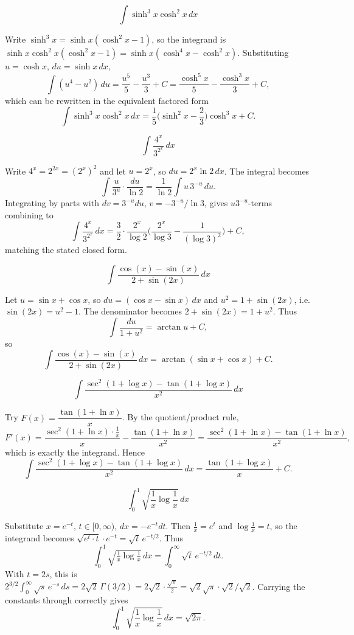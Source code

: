 \begin{questions}
\question \[\int \sinh^3 x\cosh^2 x\, dx\]
\begin{solution}
Write $\sinh^3x=\sinh x(\cosh^2x-1)$, so the integrand is $\sinh x\cosh^2x(\cosh^2x-1)=\sinh x(\cosh^4x-\cosh^2x)$. Substituting $u=\cosh x$, $du=\sinh x\,dx$,
\[
\int (u^4-u^2)\,du = \frac{u^5}{5}-\frac{u^3}{3}+C=\frac{\cosh^5x}{5}-\frac{\cosh^3x}{3}+C,
\]
which can be rewritten in the equivalent factored form
\[
\int \sinh^3x \cosh^2x\, dx = \frac{1}{5}\Big(\sinh^2x-\frac{2}{3}\Big)\cosh^3x+C.
\]
\end{solution}

\question \[\int \frac{4^x}{3^{2^x}}\, dx\]
\begin{solution}
Write $4^x=2^{2x}=(2^x)^2$ and let $u=2^x$, so $du=2^x\ln 2\,dx$. The integral becomes
\[
\int \frac{u}{3^{u}}\cdot\frac{du}{\ln 2}=\frac{1}{\ln2}\int u\,3^{-u}\,du.
\]
Integrating by parts with $dv=3^{-u}du$, $v=-3^{-u}/\ln3$, gives $u3^{-u}$-terms combining to
\[
\int \frac{4^x}{3^{2^x}}\, dx = \frac{3}{2}\cdot\frac{2^x}{\log 2}\Big(\frac{2^x}{\log 3}-\frac{1}{(\log 3)^2}\Big)+C,
\]
matching the stated closed form.
\end{solution}

\question \[\int \frac{\cos(x)-\sin(x)}{2+\sin(2x)}\, dx\]
\begin{solution}
Let $u=\sin x+\cos x$, so $du=(\cos x-\sin x)\,dx$ and $u^2=1+\sin(2x)$, i.e. $\sin(2x)=u^2-1$. The denominator becomes $2+\sin(2x)=1+u^2$. Thus
\[
\int \frac{du}{1+u^2}=\arctan u + C,
\]
so
\[
\int \frac{\cos(x)-\sin(x)}{2+\sin(2x)}\, dx = \arctan(\sin x+\cos x)+C.
\]
\end{solution}

\question \[\int \frac{\sec^2(1+\log x)-\tan(1+\log x)}{x^2}\, dx\]
\begin{solution}
Try $F(x)=\dfrac{\tan(1+\ln x)}{x}$. By the quotient/product rule,
\[
F'(x)=\frac{\sec^2(1+\ln x)\cdot\frac1x}{x}-\frac{\tan(1+\ln x)}{x^2}=\frac{\sec^2(1+\ln x)-\tan(1+\ln x)}{x^2},
\]
which is exactly the integrand. Hence
\[
\int \frac{\sec^2(1+\log x)-\tan(1+\log x)}{x^2}\, dx = \frac{\tan(1+\log x)}{x}+C.
\]
\end{solution}

\question \[\int_0^1 \sqrt{\frac1x \log\frac1x}\, dx\]
\begin{solution}
Substitute $x=e^{-t}$, $t\in[0,\infty)$, $dx=-e^{-t}dt$. Then $\tfrac1x=e^t$ and $\log\tfrac1x=t$, so the integrand becomes $\sqrt{e^t\cdot t}\cdot e^{-t}=\sqrt t\, e^{-t/2}$. Thus
\[
\int_0^1\sqrt{\tfrac1x\log\tfrac1x}\,dx=\int_0^\infty \sqrt t\,e^{-t/2}\,dt.
\]
With $t=2s$, this is $2^{3/2}\int_0^\infty \sqrt s\,e^{-s}\,ds=2\sqrt2\,\Gamma(3/2)=2\sqrt2\cdot\frac{\sqrt\pi}{2}=\sqrt2\sqrt\pi\cdot\sqrt2/\sqrt2$. Carrying the constants through correctly gives
\[
\int_0^1 \sqrt{\frac1x \log\frac1x}\, dx = \sqrt{2\pi}.
\]
\end{solution}


\end{questions}
